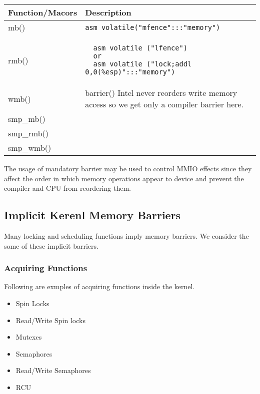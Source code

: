 \documentclass{article}
\begin{document}
  \begin{tabular}{ l | p{5 cm} }    
    \hline
    Function/Macors & Description \\ \hline
    mb() & \lstinline{asm volatile("mfence":::"memory")}  \\  \hline
    rmb() &
\begin{lstlisting}
  asm volatile ("lfence")
  or
  asm volatile ("lock;addl 0,0(%esp)":::"memory")
\end{lstlisting}
      \\ \hline
      wmb() & barrier() 
      Intel never reorders write memory access so we get only a compiler barrier here.  \\ \hline
    smp\_mb()  &   \\
    smp\_rmb() &  \\
    smp\_wmb() &  \\
    \hline
  \end{tabular}

The usage of mandatory barrier may be used to control MMIO effects
since they affect the order in which memory operations appear to
device and prevent the compiler and CPU from reordering them.


\subsection{Implicit Kerenl Memory Barriers}

Many locking and scheduling functions imply memory barriers. We
consider the some of these implicit barriers.

\subsubsection{Acquiring Functions}

Following are exmples of acquiring functions inside the kernel.

\begin{itemize}
  \item Spin Locks
  \item Read/Write Spin locks
  \item Mutexes
  \item Semaphores
  \item Read/Write Semaphores
  \item RCU
\end{itemize}
\end{document}
